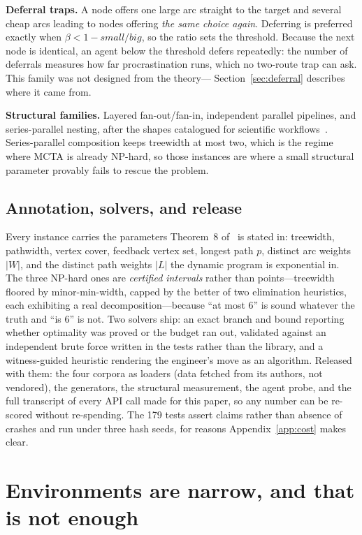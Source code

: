 \documentclass[10pt]{article}
\begin{document}
\textbf{Deferral traps.} A node offers one large arc straight to the target and
several cheap arcs leading to nodes offering \emph{the same choice again}. Deferring
is preferred exactly when $\beta < 1 - \textit{small}/\textit{big}$, so the ratio
sets the threshold. Because the next node is identical, an agent below the threshold
defers repeatedly: the number of deferrals measures how far procrastination runs,
which no two-route trap can ask. This family was not designed from the theory---
Section~\ref{sec:deferral} describes where it came from.

\textbf{Structural families.} Layered fan-out/fan-in, independent parallel
pipelines, and series-parallel nesting, after the shapes catalogued for scientific
workflows~\cite{bharathi}. Series-parallel composition keeps treewidth at most two,
which is the regime where MCTA is already NP-hard, so those instances are where a
small structural parameter provably fails to rescue the problem.

\subsection{Annotation, solvers, and release}

Every instance carries the parameters Theorem~8 of~\cite{belova2026} is stated in:
treewidth, pathwidth, vertex cover, feedback vertex set, longest path $p$, distinct
arc weights $|W|$, and the distinct path weights $|L|$ the dynamic program is
exponential in. The three NP-hard ones are \emph{certified intervals} rather than
points---treewidth floored by minor-min-width, capped by the better of two
elimination heuristics, each exhibiting a real decomposition---because ``at most 6''
is sound whatever the truth and ``is 6'' is not. Two solvers ship: an exact branch
and bound reporting whether optimality was proved or the budget ran out, validated
against an independent brute force written in the tests rather than the library, and
a witness-guided heuristic rendering the engineer's move as an algorithm. Released
with them: the four corpora as loaders (data fetched from its authors, not vendored),
the generators, the structural measurement, the agent probe, and the full transcript
of every API call made for this paper, so any number can be re-scored without
re-spending. The 179 tests assert claims rather than absence of crashes and run under
three hash seeds, for reasons Appendix~\ref{app:cost} makes clear.

\section{Environments are narrow, and that is not enough}
\label{sec:c1}
\end{document}
